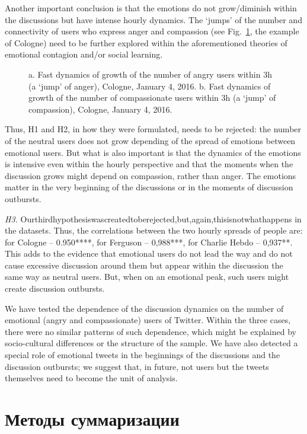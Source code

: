 Another important conclusion is that the emotions do not grow/diminish within the discussions but have intense hourly dynamics. The ‘jumps’ of the number and connectivity of users who express anger and compassion (see Fig.~\cref{fig:fastDynamcs}, the example of Cologne) need to be further explored within the aforementioned theories of emotional contagion and/or social learning.

\begin{figure}[ht]
	\caption{a. Fast dynamics of growth of the number of angry users within 3h (a ‘jump’ of anger), Cologne, January 4, 2016. b. Fast dynamics of growth of the number of compassionate users within 3h (a ‘jump’ of compassion), Cologne, January 4, 2016.}\label{fig:fastDynamcs}
\end{figure} 

Thus, H1 and H2, in how they were formulated, needs to be rejected: the number of the neutral users does not grow depending of the spread of emotions between emotional users. But what is also important is that the dynamics of the emotions is intensive even within the hourly perspective and that the moments when the discussion grows might depend on compassion, rather than anger. The emotions matter in the very beginning of the discussions or in the moments of discussion outbursts.

\textit{H3.} Ourthirdhypothesiswascreatedtoberejected,but,again,thisisnotwhathappens in the datasets. Thus, the correlations between the two hourly spreads of people are: for Cologne -- 0.950****, for Ferguson -- 0,988***, for Charlie Hebdo -- 0,937**. This adds to the evidence that emotional users do not lead the way and do not cause excessive discussion around them but appear within the discussion the same way as neutral users. But, when on an emotional peak, such users might create discussion outbursts.

We have tested the dependence of the discussion dynamics on the number of emotional (angry and compassionate) users of Twitter. Within the three cases, there were no similar patterns of such dependence, which might be explained by socio-cultural differences or the structure of the sample. We have also detected a special role of emotional tweets in the beginnings of the discussions and the discussion outbursts; we suggest that, in future, not users but the tweets themselves need to become the unit of analysis.

\section{Методы суммаризации}\label{sec:ch5/sect4}

\FloatBarrier

